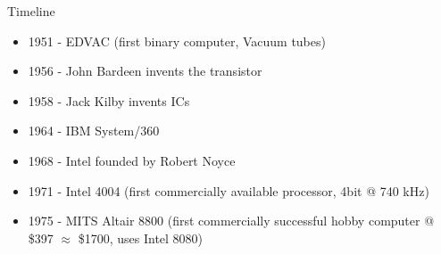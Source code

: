 \documentclass{beamer}
\begin{document}
\begin{frame}{Timeline}
\begin{itemize}
  \item 1951 - EDVAC (first binary computer, Vacuum tubes)
  \item 1956 - John Bardeen invents the transistor
  \item 1958 - Jack Kilby invents ICs
  \item 1964 - IBM System/360
  \item 1968 - Intel founded by Robert Noyce
  \item 1971 - Intel 4004 (first commercially available processor, 4bit @ 740 kHz)
  \item 1975 - MITS Altair 8800 (first commercially successful hobby computer @ \$397 $\approx$ \$1700, uses Intel 8080) 
\end{itemize}
\end{frame}
\end{document}

